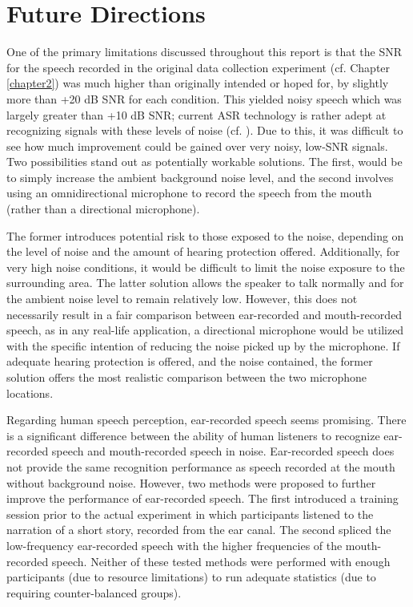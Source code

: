 \section{Future Directions}\label{chap5:future-research}

One of the primary limitations discussed throughout this report is that the SNR for the speech recorded in the original data collection experiment (cf. Chapter \ref{chapter2}) was much higher than originally intended or hoped for, by slightly more than +20 dB SNR for each condition.  This yielded noisy speech which was largely greater than +10 dB SNR; current ASR technology is rather adept at recognizing signals with these levels of noise (cf. \cite{braun:16}).  Due to this, it was difficult to see how much improvement could be gained over very noisy, low-SNR signals.  Two possibilities stand out as potentially workable solutions.  The first, would be to simply increase the ambient background noise level, and the second involves using an omnidirectional microphone to record the speech from the mouth (rather than a directional microphone).  

The former introduces potential risk to those exposed to the noise, depending on the level of noise and the amount of hearing protection offered.  Additionally, for very high noise conditions, it would be difficult to limit the noise exposure to the surrounding area.  The latter solution allows the speaker to talk normally and for the ambient noise level to remain relatively low.  However, this does not necessarily result in a fair comparison between ear-recorded and mouth-recorded speech, as in any real-life application, a directional microphone would be utilized with the specific intention of reducing the noise picked up by the microphone.  If adequate hearing protection is offered, and the noise contained, the former solution offers the most realistic comparison between the two microphone locations.

Regarding human speech perception, ear-recorded speech seems promising.  There is a significant difference between the ability of human listeners to recognize ear-recorded speech and mouth-recorded speech in noise.  Ear-recorded speech does not provide the same recognition performance as speech recorded at the mouth without background noise.  However, two methods were proposed to further improve the performance of ear-recorded speech.  The first introduced a training session prior to the actual experiment in which participants listened to the narration of a short story, recorded from the ear canal.  The second spliced the low-frequency ear-recorded speech with the higher frequencies of the mouth-recorded speech.  Neither of these tested methods were performed with enough participants (due to resource limitations) to run adequate statistics (due to requiring counter-balanced groups).  

